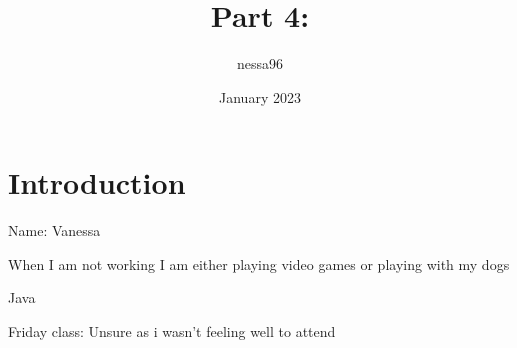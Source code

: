 \documentclass{article}
\title{Part 4:}
\author{nessa96 }
\date{January 2023}
\begin{document}
\maketitle

\section{Introduction}
Name: Vanessa

When I am not working I am either playing video games or playing with my dogs

Java

Friday class: Unsure as i wasn't feeling well to attend
\end{document}
